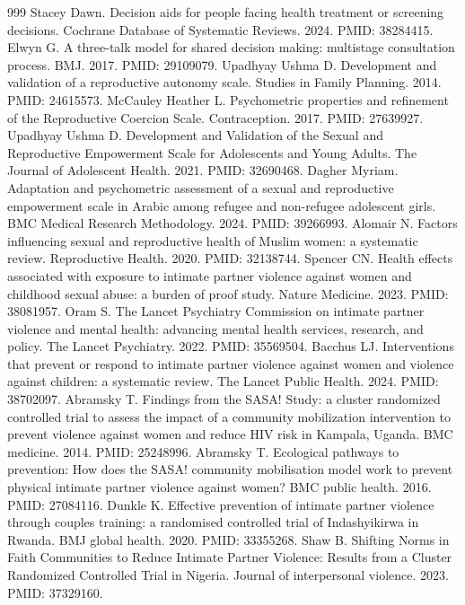 \documentclass[11pt]{article}
\begin{document}
\begin{thebibliography}{999}
 Stacey Dawn. Decision aids for people facing health treatment or screening decisions. Cochrane Database of Systematic Reviews. 2024. PMID: 38284415.
 Elwyn G. A three-talk model for shared decision making: multistage consultation process. BMJ. 2017. PMID: 29109079.
 Upadhyay Ushma D. Development and validation of a reproductive autonomy scale. Studies in Family Planning. 2014. PMID: 24615573.
 McCauley Heather L. Psychometric properties and refinement of the Reproductive Coercion Scale. Contraception. 2017. PMID: 27639927.
 Upadhyay Ushma D. Development and Validation of the Sexual and Reproductive Empowerment Scale for Adolescents and Young Adults. The Journal of Adolescent Health. 2021. PMID: 32690468.
 Dagher Myriam. Adaptation and psychometric assessment of a sexual and reproductive empowerment scale in Arabic among refugee and non-refugee adolescent girls. BMC Medical Research Methodology. 2024. PMID: 39266993.
 Alomair N. Factors influencing sexual and reproductive health of Muslim women: a systematic review. Reproductive Health. 2020. PMID: 32138744.
 Spencer CN. Health effects associated with exposure to intimate partner violence against women and childhood sexual abuse: a burden of proof study. Nature Medicine. 2023. PMID: 38081957.
 Oram S. The Lancet Psychiatry Commission on intimate partner violence and mental health: advancing mental health services, research, and policy. The Lancet Psychiatry. 2022. PMID: 35569504.
 Bacchus LJ. Interventions that prevent or respond to intimate partner violence against women and violence against children: a systematic review. The Lancet Public Health. 2024. PMID: 38702097.
 Abramsky T. Findings from the SASA! Study: a cluster randomized controlled trial to assess the impact of a community mobilization intervention to prevent violence against women and reduce HIV risk in Kampala, Uganda. BMC medicine. 2014. PMID: 25248996.
 Abramsky T. Ecological pathways to prevention: How does the SASA! community mobilisation model work to prevent physical intimate partner violence against women? BMC public health. 2016. PMID: 27084116.
 Dunkle K. Effective prevention of intimate partner violence through couples training: a randomised controlled trial of Indashyikirwa in Rwanda. BMJ global health. 2020. PMID: 33355268.
 Shaw B. Shifting Norms in Faith Communities to Reduce Intimate Partner Violence: Results from a Cluster Randomized Controlled Trial in Nigeria. Journal of interpersonal violence. 2023. PMID: 37329160.

\end{thebibliography}
\end{document}
